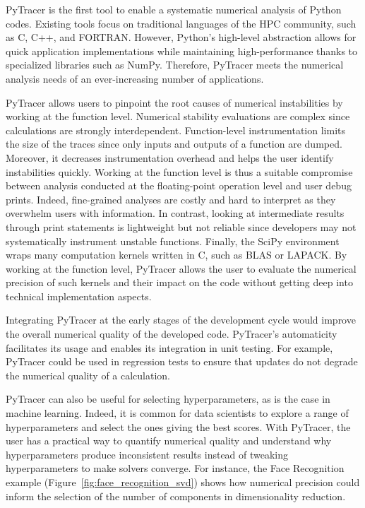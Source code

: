 \documentclass[11pt]{article}
\newcommand{\pytracer}[0]{PyTracer\xspace}
\begin{document}
\pytracer is the first tool to enable a systematic numerical analysis of Python codes. Existing tools focus on traditional languages of the HPC community, such as C, C++, and FORTRAN. However, Python's high-level abstraction allows for quick application implementations while maintaining high-performance thanks to specialized libraries such as NumPy. Therefore, \pytracer meets the numerical analysis needs of an ever-increasing number of applications.

\pytracer allows users to pinpoint the root causes of numerical instabilities by working at the function level. Numerical stability evaluations are complex since calculations are strongly interdependent. Function-level instrumentation limits the size of the traces since only inputs and outputs of a function are dumped. Moreover, it decreases instrumentation overhead and helps the user identify instabilities quickly. Working at the function level is thus a suitable compromise between analysis conducted at the floating-point operation level and user debug prints. Indeed,  fine-grained analyses are costly and hard to interpret as they overwhelm users with information. In contrast, looking at intermediate results through print statements 
is lightweight but not reliable since developers may not systematically instrument unstable functions. Finally, the SciPy environment wraps many computation kernels written in C, such as BLAS or LAPACK. By working at the function level, \pytracer allows the user to evaluate the numerical precision of such kernels and their impact on the code without getting deep into technical implementation aspects. 

Integrating \pytracer at the early stages of the development cycle would improve the overall numerical quality of the developed code.
\pytracer's automaticity facilitates its usage and enables its integration in unit testing.
For example, \pytracer could be used in regression tests to ensure that updates do not degrade the numerical quality of a calculation. 

\pytracer can also be useful for selecting hyperparameters, as is the case in machine learning.
Indeed, it is common for data scientists to explore a range of hyperparameters and select the ones giving the best scores. With \pytracer, the user has a practical way to quantify numerical quality and understand why hyperparameters produce inconsistent results instead of tweaking hyperparameters to make solvers converge. For instance, the Face Recognition example  (Figure~\ref{fig:face_recognition_svd}) shows how numerical precision could inform the selection of the number of components in dimensionality reduction. 
\end{document}
